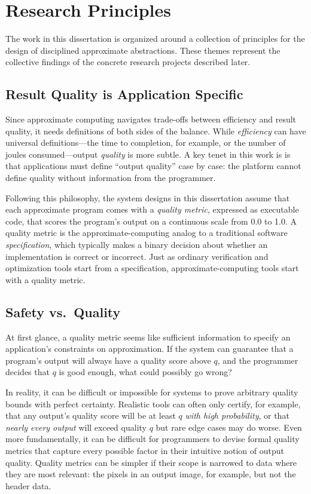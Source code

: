 \section{Research Principles}

The work in this dissertation is organized around a collection of principles
for the design of disciplined approximate abstractions.
These themes represent the collective findings of the concrete research
projects described later.

\subsection{Result Quality is Application Specific}

Since approximate computing navigates trade-offs between efficiency and result
quality, it needs definitions of both sides of the balance.
While \emph{efficiency} can have universal definitions---the time to
completion, for example, or the number of joules consumed---output
\emph{quality} is more subtle.
A key tenet in this work is is that applications must define ``output
quality'' case by case:
the platform cannot define quality without information from the programmer.

Following this philosophy, the system designs in this dissertation assume that
each approximate program comes with a \emph{quality metric}, expressed as
executable code, that scores the program's output on a continuous scale from
0.0 to 1.0.
A quality metric is the approximate-computing analog to a traditional software
\emph{specification}, which typically makes a binary decision about whether an
implementation is correct or incorrect.
Just as ordinary verification and optimization tools start from a
specification, approximate-computing tools start with a quality metric.

\subsection{Safety vs.~Quality}

At first glance, a quality metric seems like sufficient information to specify
an application's constraints on approximation.
If the system can guarantee that a program's output will always have a quality
score above $q$, and the programmer decides that $q$ is good enough, what
could possibly go wrong?

In reality, it can be difficult or impossible for systems to prove arbitrary
quality bounds with perfect certainty.
Realistic tools can often only certify, for example, that any output's quality
score will be at least $q$ \emph{with high probability},
or that \emph{nearly every output} will exceed quality $q$ but rare edge cases
may do worse.
Even more fundamentally, it can be difficult for programmers to devise formal
quality metrics that capture every possible factor in their intuitive notion
of output quality.
Quality metrics can be simpler if their scope is narrowed to data where they
are most relevant: the pixels in an output image, for example, but not the
header data.

